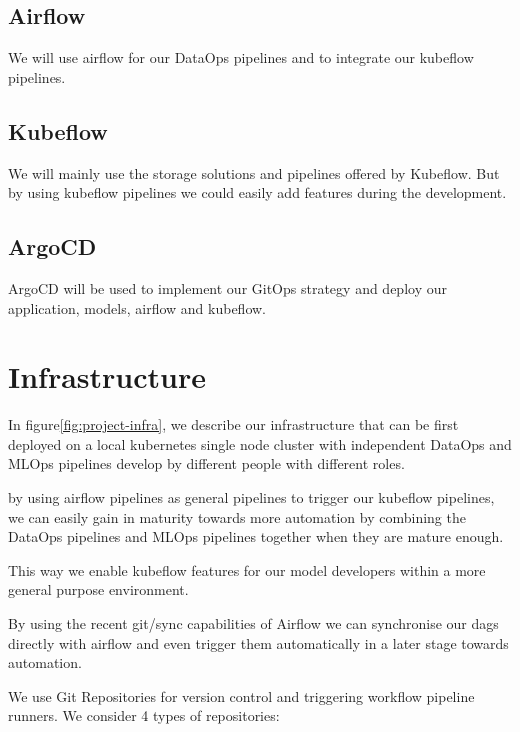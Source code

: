\subsection{Airflow}\label{subsec:airflow}
We will use airflow for our DataOps pipelines and to integrate our kubeflow pipelines.


\subsection{Kubeflow}\label{subsec:kubeflow}
We will mainly use the storage solutions and pipelines offered by Kubeflow.
But by using kubeflow pipelines we could easily add features during the development.

\subsection{ArgoCD}\label{subsec:argocd}
ArgoCD will be used to implement our GitOps strategy and deploy our application, models, airflow and kubeflow.

\section{Infrastructure}\label{sec:infrastructure}

In figure\ref{fig:project-infra}, we describe our infrastructure that can be first deployed on a local kubernetes single node cluster
with independent DataOps and MLOps pipelines develop by different people with different roles.

by using airflow pipelines as general pipelines to trigger our kubeflow pipelines, we can easily gain in maturity towards
more automation by combining the DataOps pipelines and MLOps pipelines together when they are mature enough.

This way we enable kubeflow features for our model developers within a more general purpose environment.

By using the recent git/sync capabilities of Airflow we can synchronise our dags directly with airflow and
even trigger them automatically in a later stage towards automation.

We use Git Repositories for version control and triggering workflow pipeline runners.
We consider 4 types of repositories:

